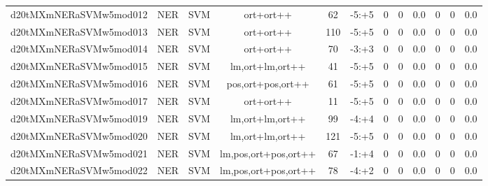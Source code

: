 \documentclass[a4paper]{article}
\begin{document}
\begin{landscape}
\begin{center}
\begin{tabular}{ |c|c|c|c|c|c|c|c|c|c|c|c|}
 	

 
 	
 	\small{ d20tMXmNERaSVMw5mod012 } & \small{ NER} & \small{  SVM }  & ort+ort++  &  62 &  \small{  -5:+5 }  &  0 & 0 & 0.0  &  0 & 0 & 0.0 \\
 	

 
 	
 	\small{ d20tMXmNERaSVMw5mod013 } & \small{ NER} & \small{  SVM }  & ort+ort++  &  110 &  \small{  -5:+5 }  &  0 & 0 & 0.0  &  0 & 0 & 0.0 \\
 	

 
 	
 	\small{ d20tMXmNERaSVMw5mod014 } & \small{ NER} & \small{  SVM }  & ort+ort++  &  70 &  \small{  -3:+3 }  &  0 & 0 & 0.0  &  0 & 0 & 0.0 \\
 	

 
 	
 	\small{ d20tMXmNERaSVMw5mod015 } & \small{ NER} & \small{  SVM }  & lm,ort+lm,ort++  &  41 &  \small{  -5:+5 }  &  0 & 0 & 0.0  &  0 & 0 & 0.0 \\
 	

 
 	
 	\small{ d20tMXmNERaSVMw5mod016 } & \small{ NER} & \small{  SVM }  & pos,ort+pos,ort++  &  61 &  \small{  -5:+5 }  &  0 & 0 & 0.0  &  0 & 0 & 0.0 \\
 	

 
 	
 	\small{ d20tMXmNERaSVMw5mod017 } & \small{ NER} & \small{  SVM }  & ort+ort++  &  11 &  \small{  -5:+5 }  &  0 & 0 & 0.0  &  0 & 0 & 0.0 \\
 	

 
 	
 	\small{ d20tMXmNERaSVMw5mod019 } & \small{ NER} & \small{  SVM }  & lm,ort+lm,ort++  &  99 &  \small{  -4:+4 }  &  0 & 0 & 0.0  &  0 & 0 & 0.0 \\
 	

 
 	
 	\small{ d20tMXmNERaSVMw5mod020 } & \small{ NER} & \small{  SVM }  & lm,ort+lm,ort++  &  121 &  \small{  -5:+5 }  &  0 & 0 & 0.0  &  0 & 0 & 0.0 \\
 	

 
 	
 	\small{ d20tMXmNERaSVMw5mod021 } & \small{ NER} & \small{  SVM }  & lm,pos,ort+pos,ort++  &  67 &  \small{  -1:+4 }  &  0 & 0 & 0.0  &  0 & 0 & 0.0 \\
 	

 
 	
 	\small{ d20tMXmNERaSVMw5mod022 } & \small{ NER} & \small{  SVM }  & lm,pos,ort+pos,ort++  &  78 &  \small{  -4:+2 }  &  0 & 0 & 0.0  &  0 & 0 & 0.0 \\
 	


\end{tabular}
\end{center}
\end{landscape}
\end{document}
